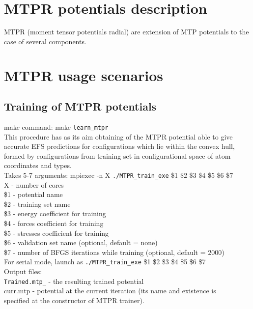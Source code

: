 \documentclass[12pt]{article}
\renewcommand{\_}{\char`_}
\begin{document}
\section*{MTPR potentials description}

MTPR (moment tensor potentials radial) are extension of MTP potentials
to the case of several components. 


\section*{MTPR usage scenarios}


\subsection*{Training of MTPR potentials}
 
make command: make \verb|learn_mtpr|\\

This procedure has as its aim obtaining of the MTPR potential able
to give accurate EFS predictions for configurations which lie within
the convex hull, formed by configurations from training set in configurational
space of atom coordinates and types.\\

\noindent Takes 5-7 arguments: mpiexec -n X \verb|./MTPR_train_exe| \$1 \$2 \$3 \$4 \$5 \$6 \$7\\
X - number of cores \\
\$1 - potential name\\
\$2 - training set name\\
\$3 - energy coefficient for training\\
\$4 - forces coefficient for training\\
\$5 - stresses coefficient for training\\
\$6 - validation set name (optional, default = none)\\
\$7 - number of BFGS iterations while training (optional, default = 2000)\\

For serial mode, launch as \verb|./MTPR_train_exe| \$1 \$2 \$3 \$4 \$5 \$6 \$7\\

Output files: \\
\verb|Trained.mtp_| - the resulting trained potential\\
curr.mtp - potential at the current iteration (its name and existence is \\
specified at the constructor of MTPR trainer).\\
\end{document}
